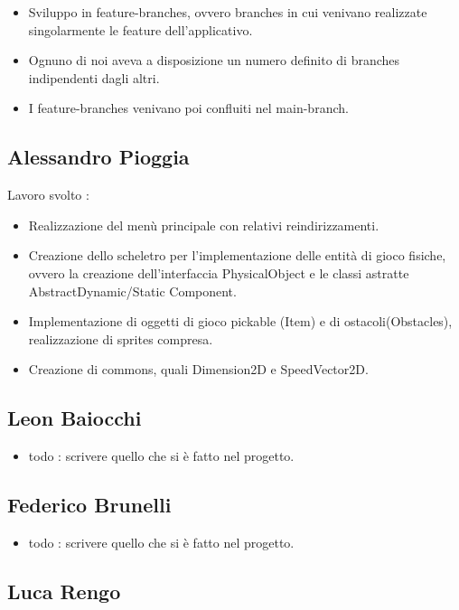 \begin{itemize}
	\item Sviluppo in feature-branches, ovvero branches in cui venivano realizzate singolarmente le feature dell'applicativo.
	\item Ognuno di noi aveva a disposizione un numero definito di branches indipendenti dagli altri.
	\item I feature-branches venivano poi confluiti nel main-branch.
\end{itemize}

\subsection*{Alessandro Pioggia}
Lavoro svolto : 
\begin{itemize}
	\item Realizzazione del menù principale con relativi reindirizzamenti.
	\item Creazione dello scheletro per l'implementazione delle entità di gioco fisiche, ovvero la creazione dell'interfaccia PhysicalObject e le classi astratte AbstractDynamic/Static Component.
	\item Implementazione di oggetti di gioco pickable (Item) e di ostacoli(Obstacles), realizzazione di sprites compresa.
	\item Creazione di commons, quali Dimension2D e SpeedVector2D.
	 
	 
\end{itemize}


\subsection*{Leon Baiocchi}

\begin{itemize}
	\item  todo : scrivere quello che si è fatto nel progetto.
\end{itemize}

\subsection*{Federico Brunelli}

\begin{itemize}
	\item  todo : scrivere quello che si è fatto nel progetto.
\end{itemize}

\subsection*{Luca Rengo}

